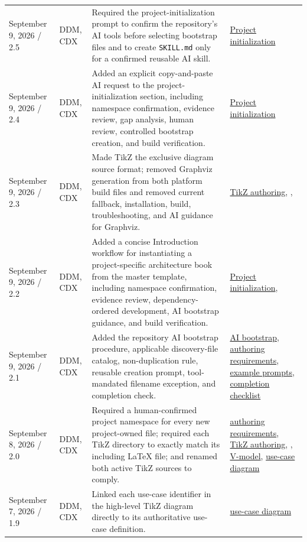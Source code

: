 \begin{tabularx}{\linewidth}{L{3.1cm}L{2.2cm}YL{2.0cm}}
September 9, 2026 / 2.5 & DDM, CDX & Required the project-initialization prompt to confirm the repository's AI tools before selecting bootstrap files and to create \texttt{SKILL.md} only for a confirmed reusable AI skill. & \hyperref[Section:InitializeNewProject]{Project initialization}\\
September 9, 2026 / 2.4 & DDM, CDX & Added an explicit copy-and-paste AI request to the project-initialization section, including namespace confirmation, evidence review, gap analysis, human review, controlled bootstrap creation, and build verification. & \hyperref[Section:InitializeNewProject]{Project initialization}\\
September 9, 2026 / 2.3 & DDM, CDX & Made TikZ the exclusive diagram source format; removed Graphviz generation from both platform build files and removed current fallback, installation, build, troubleshooting, and AI guidance for Graphviz. & \hyperref[Section:TikZAuthoring]{TikZ authoring}, , \\
September 9, 2026 / 2.2 & DDM, CDX & Added a concise Introduction workflow for instantiating a project-specific architecture book from the master template, including namespace confirmation, evidence review, dependency-ordered development, AI bootstrap guidance, and build verification. & \hyperref[Section:InitializeNewProject]{Project initialization}, \\
September 9, 2026 / 2.1 & DDM, CDX & Added the repository AI bootstrap procedure, applicable discovery-file catalog, non-duplication rule, reusable creation prompt, tool-mandated filename exception, and completion check. & \hyperref[Section:AIRepositoryBootstrap]{AI bootstrap}, \hyperref[Table:DocumentAuthoringRequirements]{authoring requirements}, \hyperref[Section:AIExamplePrompts]{example prompts}, \hyperref[Table:AICompletionChecklist]{completion checklist}\\
September 8, 2026 / 2.0 & DDM, CDX & Required a human-confirmed project namespace for every new project-owned file; required each TikZ directory to exactly match its including LaTeX file; and renamed both active TikZ sources to comply. & \hyperref[Table:DocumentAuthoringRequirements]{authoring requirements}, \hyperref[Section:TikZAuthoring]{TikZ authoring}, , \hyperref[Figure:VModel]{V-model}, \hyperref[Figure:UseCaseDiagram]{use-case diagram}\\
September 7, 2026 / 1.9 & DDM, CDX & Linked each use-case identifier in the high-level TikZ diagram directly to its authoritative use-case definition. & \hyperref[Figure:UseCaseDiagram]{use-case diagram}\\

\end{tabularx}
